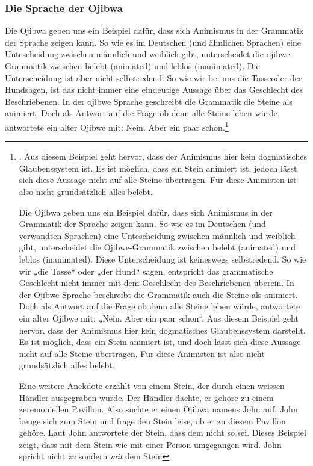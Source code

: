 \subsubsection*{Die Sprache der Ojibwa}
Die Ojibwa geben uns ein Beispiel dafür, dass sich Animismus in der Grammatik der Sprache zeigen kann. So wie es im Deutschen (und ähnlichen Sprachen) eine Untescheidung zwischen männlich und weiblich gibt, unterscheidet die ojibwe Grammatik zwischen belebt (animated) und leblos (inanimated). Die Unterscheidung ist aber nicht selbstredend. So wie wir bei uns \glqq die Tasse\grqq oder \glqq der Hund\grqq sagen, ist das nicht immer eine eindeutige Aussage über das Geschlecht des Beschriebenen. In der ojibwe Sprache geschreibt die Grammatik die Steine als animiert. Doch als Antwort auf die Frage ob denn alle Steine leben würde, antwortete ein alter Ojibwe mit: \glqq Nein. Aber ein paar schon.\grqq\footnote{\textsc{}. Aus diesem Beispiel geht hervor, dass der Animismus hier kein dogmatisches Glaubenssystem ist. Es ist möglich, dass ein Stein animiert ist, jedoch lässt sich diese Aussage nicht auf alle Steine übertragen. Für diese Animisten ist also nicht grundsätzlich alles belebt.

Die Ojibwa geben uns ein Beispiel dafür, dass sich Animismus in der Grammatik der Sprache zeigen kann. So wie es im Deutschen (und verwandten Sprachen) eine Untescheidung zwischen männlich und weiblich gibt, unterscheidet die Ojibwe-Grammatik zwischen belebt (animated) und leblos (inanimated). Diese Unterscheidung ist keineswegs selbstredend. So wie wir „die Tasse“ oder „der Hund“ sagen, entspricht das grammatische Geschlecht nicht immer mit dem Geschlecht des Beschriebenen überein. In der Ojibwe-Sprache beschreibt die Grammatik auch die Steine als animiert. Doch als Antwort auf die Frage ob denn alle Steine leben würde, antwortete ein alter Ojibwe mit: „Nein. Aber ein paar schon“. Aus diesem Beispiel geht hervor, dass der Animismus hier kein dogmatisches Glaubenssystem darstellt. Es ist möglich, dass ein Stein animiert ist, und doch lässt sich diese Aussage nicht auf alle Steine übertragen. Für diese Animisten ist also nicht grundsätzlich alles belebt. 

Eine weitere Anekdote erzählt von einem Stein, der durch einen weissen Händler ausgegraben wurde. Der Händler dachte, er gehöre zu einem zeremoniellen Pavillon. Also suchte er einen Ojibwa namens John auf. John beuge sich zum Stein und frage den Stein leise, ob er zu diesem Pavillon gehöre. Laut John antwortete der Stein, dass dem nicht so sei. Dieses Beispiel zeigt, dass mit dem Stein wie mit einer Person umgegangen wird. John spricht nicht \emph{zu} sondern \emph{mit} dem Stein 

}
